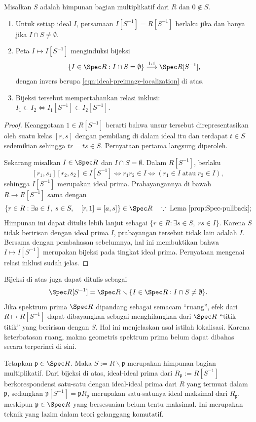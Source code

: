\begin{proposition}\label{prop:localization-ideals}
	Misalkan $S$ adalah himpunan bagian multiplikatif dari $R$ dan $0 \notin S$.
	\begin{enumerate}
		\item Untuk setiap ideal $I$, persamaan $I[S^{-1}] = R[S^{-1}]$ berlaku jika dan hanya jika $I \cap S \neq \emptyset$.
		\item Peta $I \mapsto I[S^{-1}]$ menginduksi bijeksi
			\[ \{I \in \Spec R : I \cap S = \emptyset \} \stackrel{1:1}{\longrightarrow} \Spec R[S^{-1}], \]
			dengan invers berupa \eqref{eqn:ideal-preimage-localization} di atas.
		\item Bijeksi tersebut mempertahankan relasi inklusi: $I_1 \subset I_2 \iff I_1[S^{-1}] \subset I_2[S^{-1}]$.
	\end{enumerate}
\end{proposition}
\begin{proof}
	Keanggotaan $1 \in R[S^{-1}]$ berarti bahwa unsur tersebut direpresentasikan oleh suatu kelas $[r, s]$ dengan pembilang di dalam ideal itu dan terdapat $t \in S$ sedemikian sehingga $tr = ts \in S$. Pernyataan pertama langsung diperoleh.

	Sekarang misalkan $I \in \Spec R$ dan $I \cap S = \emptyset$. Dalam $R[S^{-1}]$, berlaku
	\[ [r_1, s_1] [r_2, s_2] \in I[S^{-1}] \iff r_1 r_2 \in I \iff \left( r_1 \in I \; \text{atau} \; r_2 \in I \right), \]
	sehingga $I[S^{-1}]$ merupakan ideal prima. Prabayangannya di bawah $R \to R[S^{-1}]$ sama dengan
	\[ \{r \in R : \exists a \in I, \; s \in S, \quad [r, 1] = [a, s] \} \in \Spec R \quad \because\;\text{Lema \ref{prop:Spec-pullback}}; \]
	Himpunan ini dapat ditulis lebih lanjut sebagai $\{ r \in R : \exists s \in S, \; rs \in I \}$. Karena $S$ tidak beririsan dengan ideal prima $I$, prabayangan tersebut tidak lain adalah $I$. Bersama dengan pembahasan sebelumnya, hal ini membuktikan bahwa $I \mapsto I[S^{-1}]$ merupakan bijeksi pada tingkat ideal prima. Pernyataan mengenai relasi inklusi sudah jelas.
\end{proof}

Bijeksi di atas juga dapat ditulis sebagai
\[ \Spec R[S^{-1}] = \Spec R \smallsetminus \{I \in \Spec R : I \cap S \neq \emptyset \}. \]
Jika spektrum prima $\Spec R$ dipandang sebagai semacam ``ruang'', efek dari $R \mapsto R[S^{-1}]$ dapat dibayangkan sebagai menghilangkan dari $\Spec R$ ``titik-titik'' yang beririsan dengan $S$. Hal ini menjelaskan asal istilah lokalisasi. Karena keterbatasan ruang, makna geometris spektrum prima belum dapat dibahas secara terperinci di sini.

\begin{example}\label{eg:localization-prime}
	Tetapkan $\mathfrak{p} \in \Spec R$. Maka $S := R \smallsetminus \mathfrak{p}$ merupakan himpunan bagian multiplikatif. Dari bijeksi di atas, ideal-ideal prima dari $R_\mathfrak{p} := R[S^{-1}]$ berkorespondensi satu-satu dengan ideal-ideal prima dari $R$ yang termuat dalam $\mathfrak{p}$, sedangkan $\mathfrak{p}[S^{-1}] = \mathfrak{p} R_\mathfrak{p}$ merupakan satu-satunya ideal maksimal dari $R_\mathfrak{p}$, meskipun $\mathfrak{p} \in \Spec R$ yang bersesuaian belum tentu maksimal. Ini merupakan teknik yang lazim dalam teori gelanggang komutatif.
\end{example}
